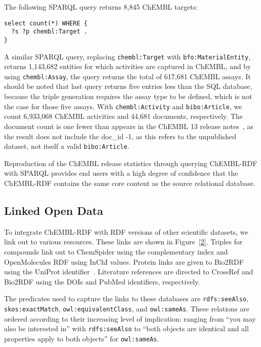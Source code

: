 \documentclass[10pt]{bmc_article}
\newenvironment{bmcformat}{\begin{raggedright}\baselineskip20pt\sloppy\setboolean{publ}{false}}{\end{raggedright}\baselineskip20pt\sloppy}
\begin{document}
\begin{bmcformat}
The following SPARQL query returns 8,845 ChEMBL targets:
     
\begin{small}
\begin{verbatim}
select count(*) WHERE {
  ?s ?p chembl:Target .
}
\end{verbatim}
\end{small}

A similar SPARQL query, replacing \verb+chembl:Target+ with \verb+bfo:MaterialEntity+, returns 1,143,682 entities for which activities are captured in ChEMBL, and by using \verb+chembl:Assay+, the query returns the total of 617,681 ChEMBL assays.
It should be noted that last query returns five entries less than the SQL database, because the
triple generation requires the assay type to be defined, which is not the case for those 
five assays. With \verb+chembl:Activity+ and \verb+bibo:Article+, we count 6,933,068 ChEMBL activities and 44,681 documents,
respectively. The document count is one fewer than appears 
in the ChEMBL 13 release notes~\cite{ChEMBL13ReleaseNotes}, as the result does not include the doc\_id -1, as this refers to the 
unpublished dataset, not itself a valid \verb+bibo:Article+.

Reproduction of the ChEMBL release statistics through querying ChEMBL-RDF with SPARQL 
provides end users with a high degree of confidence that the ChEMBL-RDF contains the same 
core content as the source relational database. 


\subsection*{Linked Open Data}

To integrate ChEMBL-RDF with RDF versions of other scientific datasets, we link out to various resources.
These links are shown in Figure~\ref{2}. Triples for compounds link out to ChemSpider 
using the complementary index and OpenMolecules RDF using InChI values. Protein links are given to Bio2RDF~\cite{Belleau2008}
using the UniProt identifier~\cite{TheUniProtConsortium2010}. Literature references are directed to CrossRef and Bio2RDF 
using the DOIs and PubMed identifiers, respectively.

The predicates used to capture the links to these databases are
\verb+rdfs:seeAlso+, \verb+skos:exactMatch+, \verb+owl:equivalentClass+, and \verb+owl:sameAs+. 
These relations are ordered according to their increasing level of implication:
ranging from ``you may also be interested in'' with \verb+rdfs:seeAlso+ to
``both objects are identical  and all properties apply to both objects'' for
\verb+owl:sameAs+.


\end{bmcformat}
\end{document}
